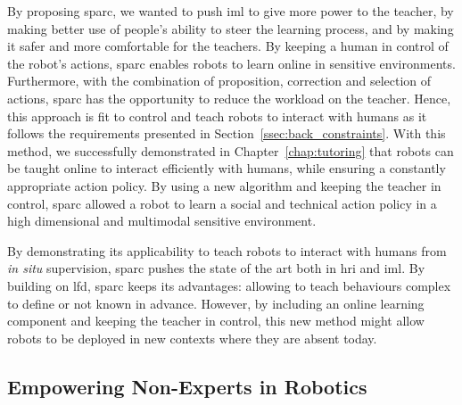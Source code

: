 By proposing \gls{sparc}, we wanted to push \gls{iml} to give more power to the teacher, by making better use of people's ability to steer the learning process, and by making it safer and more comfortable for the teachers. By keeping a human in control of the robot's actions, \gls{sparc} enables robots to learn online in sensitive environments. %
Furthermore, with the combination of proposition, correction and selection of actions, \gls{sparc} has the opportunity to reduce the workload on the teacher. Hence, this approach is fit to control and teach robots to interact with humans as it follows the requirements presented in Section~\ref{ssec:back_constraints}. With this method, we successfully demonstrated in Chapter~\ref{chap:tutoring} that robots can be taught online to interact efficiently with humans, while ensuring a constantly appropriate action policy. By using a new algorithm and keeping the teacher in control, \gls{sparc} allowed a robot to learn a social and technical action policy in a high dimensional and multimodal sensitive environment.

By demonstrating its applicability to teach robots to interact with humans from \textit{in situ} supervision, \gls{sparc} pushes the state of the art both in \gls{hri} and \gls{iml}. By building on \gls{lfd}, \gls{sparc} keeps its advantages: allowing to teach behaviours complex to define or not known in advance. However, by including an online learning component and keeping the teacher in control, this new method might allow robots to be deployed in new contexts where they are absent today.


\subsection{Empowering Non-Experts in Robotics}

